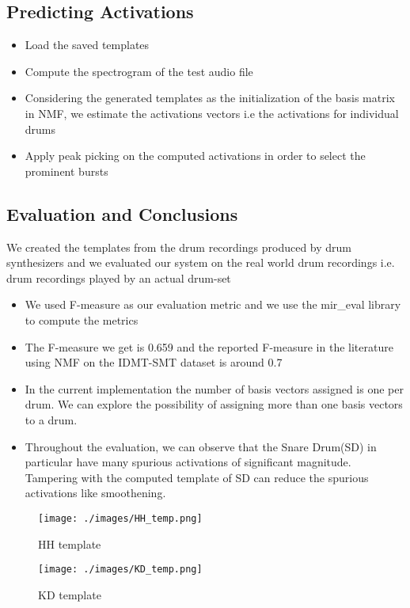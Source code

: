 \subsection*{Predicting Activations}
\begin{itemize}
\item Load the saved templates
\item Compute the spectrogram of the test audio file
\item Considering the generated templates as the initialization of the basis
matrix in NMF, we estimate the activations vectors i.e the activations
for individual drums
\item Apply peak picking on the computed activations in order to select the
prominent bursts
\end{itemize}

\subsection*{Evaluation and Conclusions} 
We created the templates from the drum recordings produced by drum synthesizers and we evaluated our system on the real world drum recordings i.e. drum recordings played by an actual drum-set
\begin{itemize}
\item We used F-measure as our evaluation metric and we use the mir\_eval library to compute the metrics
\item The F-measure we get is 0.659 and the reported F-measure in the literature using NMF on the IDMT-SMT dataset is around 0.7
\item In the current implementation the number of basis vectors assigned is one per drum. We can explore the possibility of assigning more than one basis vectors to a drum.
\item Throughout the evaluation, we can observe that the Snare Drum(SD) in particular have many spurious activations of significant magnitude. Tampering with the computed template of
SD can reduce the spurious activations like smoothening.
\end{itemize}



\begin{figure}[h!]
  \texttt{[image: ./images/HH\_temp.png]}
  \caption{HH template}
  \label{}
\end{figure}




\begin{figure}[h!]
  \texttt{[image: ./images/KD\_temp.png]}
  \caption{KD template}
  \label{}
\end{figure}




